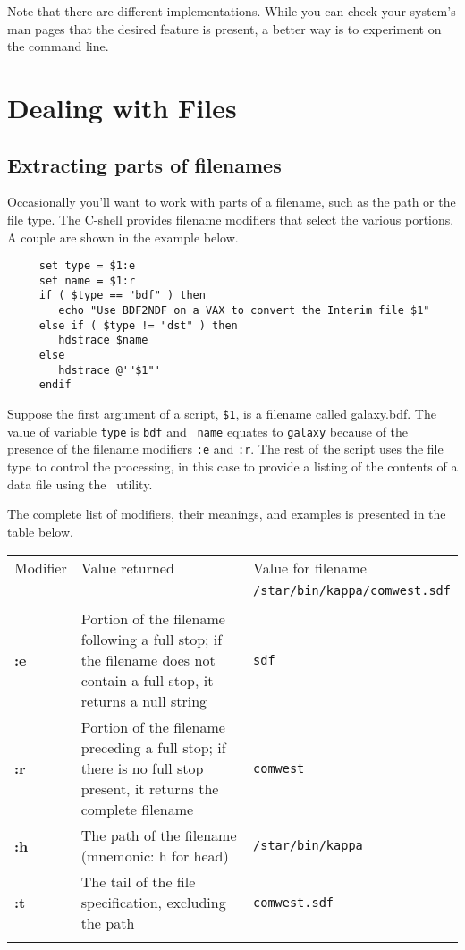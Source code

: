Note that there are different implementations.  While you can check
your system's man pages that the desired feature is present, a better
way is to experiment on the command line.

\newpage
\section{Dealing with Files\label{sc4_se_files}}


\subsection{Extracting parts of filenames
\label{sc4_se_filename_ext}}

Occasionally you'll want to work with parts of a filename, such as the
path or the file type.  The C-shell provides {\sf filename modifiers}
that select the various portions.  A couple are shown in the example
below.

\small
\begin{verbatim}
     set type = $1:e
     set name = $1:r
     if ( $type == "bdf" ) then
        echo "Use BDF2NDF on a VAX to convert the Interim file $1"
     else if ( $type != "dst" ) then
        hdstrace $name
     else
        hdstrace @'"$1"'
     endif
\end{verbatim}
\normalsize

Suppose the first argument of a script, {\tt \$1}, is a filename called
galaxy.bdf.  The value of variable {\tt type} is {\tt bdf} and {\tt
name} equates to {\tt galaxy} because of the presence of the filename
modifiers {\tt :e} and {\tt :r}.  The rest of the script uses the 
file type to control the processing, in this case to provide a listing
of the contents of a data file using the \HDSTRACEref\normalsize\ utility.

The complete list of modifiers, their meanings, and examples is
presented in the table below.
\bigskip

\begin{center}
\begin{tabular}{lp{62mm}l}
Modifier & Value returned & Value for filename \\
 & & {\tt /star/bin/kappa/comwest.sdf} \\ \hline
\\
{\bf :e} & Portion of the filename following a full stop; if the filename does
not contain a full stop, it returns a null string & {\tt sdf} \\
{\bf :r} & Portion of the filename preceding a full stop; if there is no full stop
present, it returns the complete filename & {\tt comwest} \\
{\bf :h} & The path of the filename (mnemonic: h for head) & {\tt /star/bin/kappa} \\
{\bf :t} & The tail of the file specification, excluding the path &
                                         {\tt comwest.sdf} \\ 
\\ \hline
\end{tabular}
\end{center}
\medskip

